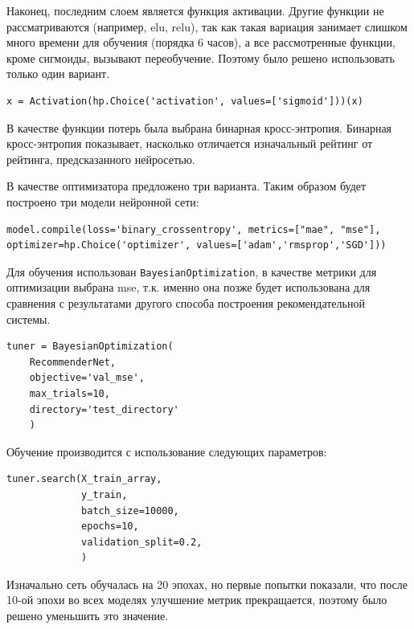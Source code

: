 \documentclass[bachelor, och, diploma]{SCWorks}
\begin{document}
Наконец, последним слоем является функция активации.  Другие функции не рассматриваются (например, elu, relu), так как такая вариация занимает слишком много времени для обучения (порядка 6 часов), а все рассмотренные функции, кроме сигмоиды, вызывают переобучение. Поэтому было решено использовать только один вариант.

\begin{verbatim}
x = Activation(hp.Choice('activation', values=['sigmoid']))(x)  
\end{verbatim}

В качестве функции потерь была выбрана бинарная кросс-энтропия. Бинарная кросс-энтропия показывает, насколько отличается
 изначальный рейтинг от рейтинга, предсказанного нейросетью. 

В качестве оптимизатора предложено три варианта. Таким образом 
будет построено три модели нейронной сети:
\begin{verbatim}
model.compile(loss='binary_crossentropy', metrics=["mae", "mse"], optimizer=hp.Choice('optimizer', values=['adam','rmsprop','SGD']))  
\end{verbatim}

Для обучения использован \verb|BayesianOptimization|, в качестве метрики для оптимизации выбрана mse, т.к. именно она позже будет использована для сравнения с результатами другого способа построения рекомендательной системы.
\begin{verbatim}
tuner = BayesianOptimization(
    RecommenderNet,                 
    objective='val_mse',                              
    max_trials=10,              
    directory='test_directory'   
    )
\end{verbatim}

Обучение производится с использование следующих параметров:

\begin{verbatim}
tuner.search(X_train_array,                  
             y_train,                  
             batch_size=10000,          
             epochs=10,                 
             validation_split=0.2,   
             )

\end{verbatim}

Изначально сеть обучалась на 20 эпохах, но первые попытки показали, что после 10-ой эпохи во всех моделях улучшение метрик прекращается, поэтому было решено уменьшить это значение.
\end{document}
